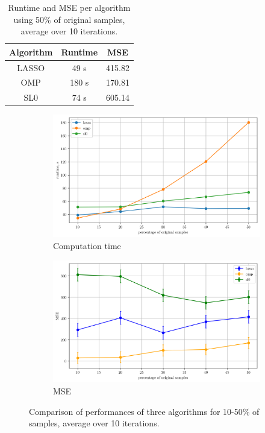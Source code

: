 \documentclass[10pt,a4paper,twoside]{article}
\begin{document}
\begin{table}[!htb]
	\centering
	\caption{Runtime and MSE per algorithm using 50\% of original samples, average over 10 iterations.}
	\begin{tabular}{|c|c|c|}
		\hline
		Algorithm & Runtime & MSE \\ \hline
		LASSO & 49 s & 415.82 \\
		OMP & 180 s & 170.81 \\ 
		SL0 & 74 s & 605.14 \\ \hline
	\end{tabular}
	\label{tab:compare}
\end{table}

\begin{figure}[!htb]
	\centering
	\begin{subfigure}{0.45\linewidth}
		\centering
		\includegraphics[width=\linewidth]{processtime.png}
		\caption{Computation time}
		\label{fig:process-time}
	\end{subfigure}
	\begin{subfigure}{0.45\linewidth}
		\centering
		\includegraphics[width=\linewidth]{mse.png}
		\caption{MSE}
		\label{fig:mse}
	\end{subfigure}
	\caption{Comparison of performances of three algorithms for 10-50\% of samples, average over 10 iterations.}
	\label{fig:comparison}
\end{figure}
\end{document}
